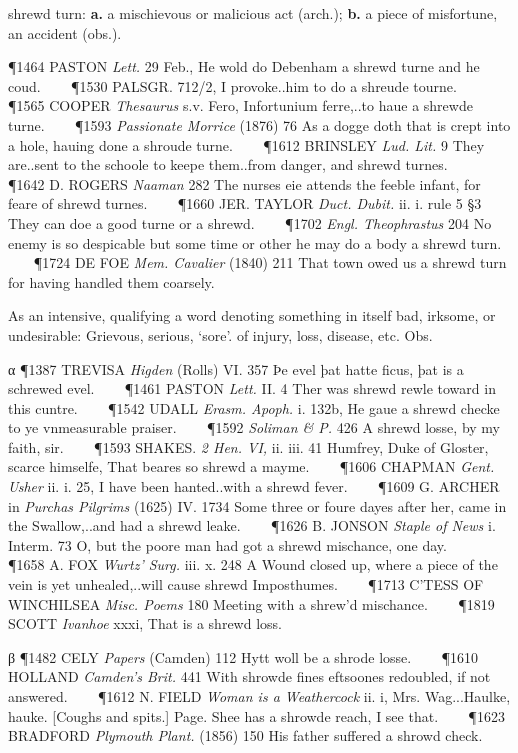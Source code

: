 \begin{description}[wide, labelwidth=!, labelindent=0pt]
\begin{myenumerate}
 shrewd turn: \textbf{a.} a mischievous or malicious act (arch.); \textbf{b.} a piece of misfortune, an accident (obs.).

\P 1464 PASTON  \textit{Lett.} 29 Feb., He wold do Debenham a shrewd turne and he coud.    
\P 1530 PALSGR. 712/2, I provoke..him to do a shreude tourne.    
\P 1565 COOPER  \textit{Thesaurus} s.v. Fero, Infortunium ferre,..to haue a shrewde turne.    
\P 1593 \textit{Passionate  Morrice} (1876) 76 As a dogge doth that is crept into a hole, hauing done a shroude turne.    
\P 1612 BRINSLEY  \textit{Lud. Lit.} 9 They are..sent to the schoole to keepe them..from danger, and shrewd turnes.    
\P 1642 D. ROGERS  \textit{Naaman} 282 The nurses eie attends the feeble infant, for feare of shrewd turnes.    
\P 1660 JER. TAYLOR  \textit{Duct. Dubit.} ii. i. rule 5 §3 They can doe a good turne or a shrewd.    
\P 1702 \textit{Engl.  Theophrastus} 204 No enemy is so despicable but some time or other he may do a body a shrewd turn.    
\P 1724 DE FOE  \textit{Mem. Cavalier} (1840) 211 That town owed us a shrewd turn for having handled them coarsely.

 As an intensive, qualifying a word denoting something in itself bad, irksome, or undesirable: Grievous, serious, ‘sore’.  of injury, loss, disease, etc. Obs.

α \P 1387 TREVISA  \textit{Higden} (Rolls) VI. 357 Þe evel þat hatte ficus, þat is a schrewed evel.    
\P 1461 PASTON  \textit{Lett.} II. 4 Ther was shrewd rewle toward in this cuntre.    
\P 1542 UDALL  \textit{Erasm. Apoph.} i. 132b, He gaue a shrewd checke to ye vnmeasurable praiser.    
\P 1592 \textit{Soliman \& P.}  426 A shrewd losse, by my faith, sir.    
\P 1593 SHAKES.  \textit{2 Hen. VI,} ii. iii. 41 Humfrey, Duke of Gloster, scarce himselfe, That beares so shrewd a mayme.    
\P 1606 CHAPMAN  \textit{Gent. Usher} ii. i. 25, I have been hanted..with a shrewd fever.    
\P 1609 G. ARCHER in  \textit{Purchas Pilgrims} (1625) IV. 1734 Some  three or foure dayes after her, came in the Swallow,..and had a shrewd leake.    
\P 1626 B. JONSON  \textit{Staple of News} i. Interm. 73 O, but the poore man had got a shrewd mischance, one day.    
\P 1658 A. FOX  \textit{Wurtz' Surg.} iii. x. 248 A Wound closed up, where a piece of the vein is yet unhealed,..will cause shrewd Imposthumes.    
\P 1713 C'TESS  OF WINCHILSEA \textit{Misc. Poems} 180 Meeting with a shrew'd mischance.    
\P 1819 SCOTT  \textit{Ivanhoe} xxxi, That is a shrewd loss.

β \P 1482 CELY  \textit{Papers} (Camden) 112 Hytt woll be a shrode losse.    
\P 1610 HOLLAND  \textit{Camden's Brit.} 441 With shrowde fines eftsoones redoubled, if not answered.    
\P 1612 N. FIELD  \textit{Woman is a Weathercock} ii. i, Mrs. Wag...Haulke, hauke. [Coughs and spits.] Page. Shee has a shrowde reach, I see that.    
\P 1623 BRADFORD  \textit{Plymouth Plant.} (1856) 150 His father suffered a shrowd check.


\end{myenumerate}
\end{description}
